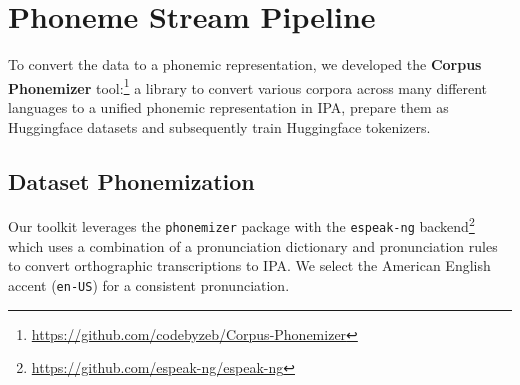 
\section{Phoneme Stream Pipeline}
\label{sec:14-pipeline}

To convert the data to a phonemic representation, we developed the \textbf{Corpus Phonemizer} tool:\footnote{\url{https://github.com/codebyzeb/Corpus-Phonemizer}} a library to convert various corpora across many different languages to a unified phonemic representation in IPA, prepare them as Huggingface datasets and subsequently train Huggingface tokenizers.

\subsection{Dataset Phonemization}

Our toolkit leverages the \texttt{phonemizer} package \citep{Bernard2021} with the \texttt{espeak-ng} backend\footnote{\url{https://github.com/espeak-ng/espeak-ng}} which uses a combination of a pronunciation dictionary and pronunciation rules to convert orthographic transcriptions to IPA. We select the American English accent (\texttt{en-US}) for a consistent pronunciation. 

